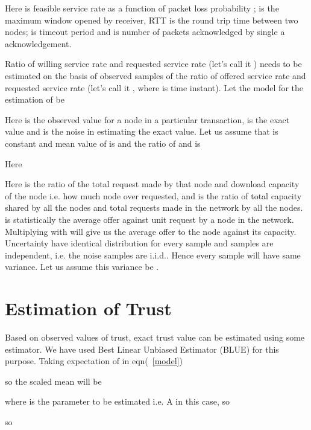 \documentclass{IEEEtran}
\begin{document}
Here  is feasible service rate as a function of packet loss probability ;  is the maximum window opened by receiver, RTT is the round trip time between two nodes;  is timeout period and  is number of packets acknowledged by single a acknowledgement.

 Ratio of willing service rate and requested service rate (let's call it ) needs to be estimated on the basis of observed samples of the ratio of offered service rate and requested service rate (let's call it , where  is time instant). Let the model for the estimation of  be


Here  is the observed value for a node in a particular transaction,  is the exact value and  is the noise in estimating the exact value. Let us assume that  is constant and mean value of  is  and the ratio of  and  is  


 Here


Here  is the ratio of the total request made by that node and download capacity of the node i.e. how much node over requested, and  is the ratio of total capacity shared by all the nodes  and total requests made in the network by all the nodes.
 is statistically the average offer against unit request by a node
in the network. Multiplying  with  will give us the average
offer to the node against its capacity. Uncertainty have identical distribution for every sample and samples are independent, i.e. the noise samples are i.i.d.. Hence every sample will have same variance. Let us assume this variance be .

\section{Estimation of Trust}
Based on observed values of trust, exact trust value can be estimated using some
estimator. We have used Best Linear Unbiased Estimator (BLUE) \cite{blue} for
this purpose.
Taking expectation of  in eqn(~\ref{model})


so the scaled mean will be


where  is the parameter to be estimated i.e. A in this case, so



so
\end{document}
